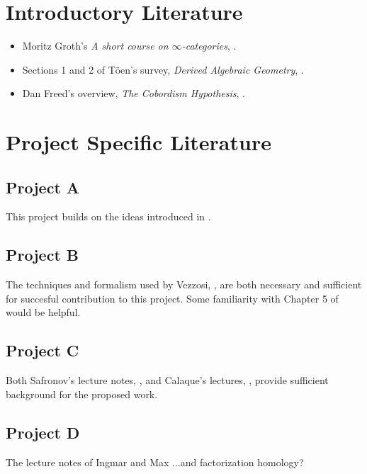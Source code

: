 \documentclass[11pt]{amsart}
\begin{document}
\section*{Introductory Literature}
\begin{itemize}
\item Moritz Groth's {\it A short course on $\infty$-categories}, \cite{MG}.
\item Sections 1 and 2 of T\"oen's survey, {\it Derived Algebraic Geometry}, \cite{Toen}.
\item Dan Freed's overview, {\it The Cobordism Hypothesis}, \cite{DF}.
\end{itemize}



\section*{Project Specific Literature}

\subsection*{Project A} This project builds on the ideas introduced in \cite{TV1}.

\subsection*{Project B} The techniques and formalism used by Vezzosi, \cite{GV}, are both necessary and sufficient for succesful contribution to this project. Some familiarity with Chapter 5 of \cite{CG2} would be helpful.

\subsection*{Project C} Both Safronov's lecture notes, \cite{PS}, and Calaque's lectures, \cite{DC}, provide sufficient background for the proposed work.

\subsection*{Project D} The lecture notes of Ingmar and Max \cite{MS}...and factorization homology?






\end{document}
